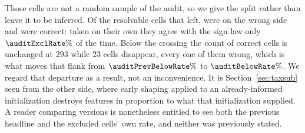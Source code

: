 Those cells are not a random sample of the audit, so we give the split rather
than leave it to be inferred. Of the \auditExclResolvable{} resolvable cells
that left, \auditExclWrong{} were on the wrong side and \auditExclCorrect{}
were correct: taken on their own they agree with the sign law only
$\auditExclRate\%$ of the time. Below the crossing the count of correct cells
is unchanged at $293$ while $23$ cells disappear, every one of them wrong,
which is what moves that flank from $\auditPrevBelowRate\%$ to
$\auditBelowRate\%$. We regard that departure as a result, not an inconvenience. It is Section~\ref{sec:taxsub} seen from the other side, where
early shaping applied to an already-informed initialization destroys features
in proportion to what that initialization supplied. A reader comparing
versions is nonetheless entitled to see both the previous headline and the
excluded cells' own rate, and neither was previously stated.

